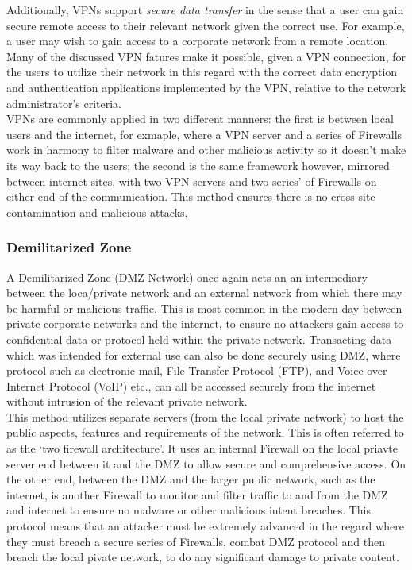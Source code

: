 \documentclass[11pt, english]{article}
\begin{document}
	Additionally, VPNs support \textit{secure data transfer} in the sense that a user can gain secure remote access to their relevant network given the correct use. For example, a user may wish to gain access to a corporate network from a remote location. Many of the discussed VPN fatures make it possible, given a VPN connection, for the users to utilize their network in this regard with the correct data encryption and authentication applications implemented by the VPN, relative to the network administrator's criteria.\\

	VPNs are commonly applied in two different manners: the first is between local users and the internet, for exmaple, where a VPN server and a series of Firewalls work in harmony to filter malware and other malicious activity so it doesn't make its way back to the users; the second is the same framework however, mirrored between internet sites, with two VPN servers and two series' of Firewalls on either end of the communication. This method ensures there is no cross-site contamination and malicious attacks.

		\subsubsection{Demilitarized Zone}

	A Demilitarized Zone (DMZ Network) once again acts an an intermediary between the loca/private network and an external network from which there may be harmful or malicious traffic. This is most common in the modern day between private corporate networks and the internet, to ensure no attackers gain access to confidential data or protocol held within the private network. Transacting data which was intended for external use can also be done securely using DMZ, where protocol such as electronic mail, File Transfer Protocol (FTP), and Voice over Internet Protocol (VoIP) etc., can all be accessed securely from the internet without intrusion of the relevant private network.\\

	This method utilizes separate servers (from the local private network) to host the public aspects, features and requirements of the network. This is often referred to as the `two firewall architecture'. It uses an internal Firewall on the local priavte server end between it and the DMZ to allow secure and comprehensive access. On the other end, between the DMZ and the larger public network, such as the internet, is another Firewall to monitor and filter traffic to and from the DMZ and internet to ensure no malware or other malicious intent breaches. This protocol means that an attacker must be extremely advanced in the regard where they must breach a secure series of Firewalls, combat DMZ protocol and then breach the local pivate network, to do any significant damage to private content.
\end{document}
